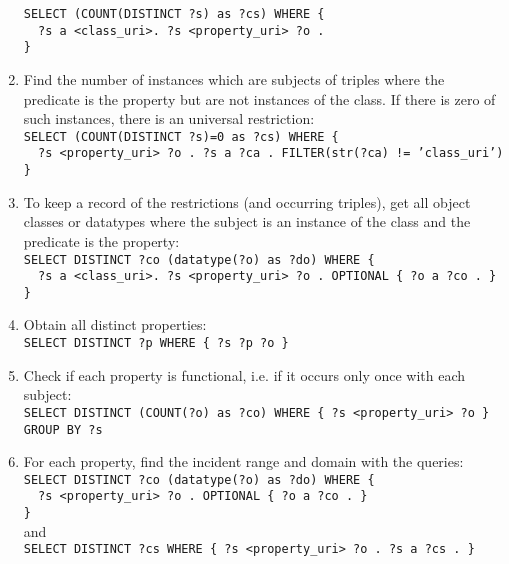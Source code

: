 \documentclass[review]{elsarticle}
\newcommand{\textttt}[1] {\texttt{\footnotesize#1}}
\newcommand{\h} {\hphantom ~ }
\begin{document}
\begin{enumerate}[leftmargin=0cm]
	\textttt{SELECT (COUNT(DISTINCT ?s) as ?cs) WHERE \{\\
	\h ?s a <class\_uri>. ?s <property\_uri> ?o .\\ \}}
\item Find the number of instances which are subjects of triples where the predicate is the property but are not instances of the class.
	If there is zero of such instances, there is an universal restriction:\\
	\textttt{SELECT (COUNT(DISTINCT ?s)=0 as ?cs) WHERE \{\\
	\h ?s <property\_uri> ?o . ?s a ?ca . FILTER(str(?ca) != 'class\_uri')\\ \}}
\item To keep a record of the restrictions (and occurring triples), get all object classes or datatypes where the subject is an instance of the class and the predicate is the property:\\
	\textttt{SELECT DISTINCT ?co (datatype(?o) as ?do) WHERE \{\\
		\h ?s a <class\_uri>. ?s <property\_uri> ?o . OPTIONAL \{ ?o a ?co . \}\\
\}}
    \item Obtain all distinct properties:\\
        \textttt{SELECT DISTINCT ?p WHERE \{ ?s ?p ?o \}}
    \item Check if each property is functional, i.e. if it
        occurs only once with each subject:\\
        \textttt{SELECT DISTINCT (COUNT(?o) as ?co) WHERE \{ ?s
            <property\_uri> ?o \} GROUP BY ?s}
    \item For each property, find the incident range and domain with the
        queries:\\
        \textttt{SELECT DISTINCT ?co (datatype(?o) as ?do) WHERE \{\\
			\h ?s <property\_uri> ?o . OPTIONAL \{ ?o a ?co . \}\\\}} \\
        and \\
        \textttt{SELECT DISTINCT ?cs WHERE \{ ?s <property\_uri> ?o . ?s a ?cs . \}}

\end{enumerate}
\end{document}
